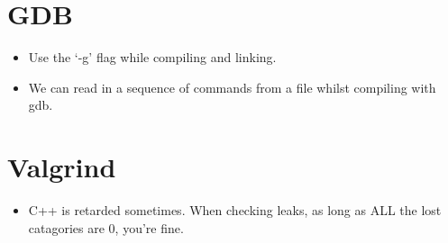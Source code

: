 \documentclass{article}
\begin{document}
\section{GDB}
\begin{itemize}
\item Use the `-g' flag while compiling and linking.
\item We can read in a sequence of commands from a file whilst compiling with gdb.  
\end{itemize}

\section{Valgrind}
\begin{itemize}
\item C++ is retarded sometimes.  When checking leaks, as long as ALL the lost catagories are 0, you're fine.
\end{itemize}
\end{document}
